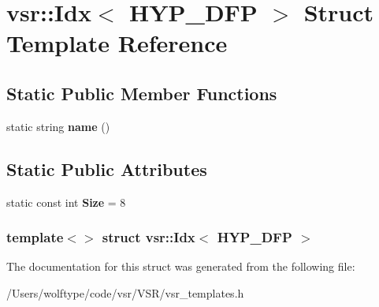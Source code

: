 \hypertarget{structvsr_1_1_idx_3_01_h_y_p___d_f_p_01_4}{\section{vsr\-:\-:Idx$<$ H\-Y\-P\-\_\-\-D\-F\-P $>$ Struct Template Reference}
\label{structvsr_1_1_idx_3_01_h_y_p___d_f_p_01_4}
}
\subsection*{Static Public Member Functions}
\begin{DoxyCompactItemize}
\item 
\hypertarget{structvsr_1_1_idx_3_01_h_y_p___d_f_p_01_4_a7cd8cab27ca61b61e62940a8c0fac247}{static string {\bfseries name} ()}\label{structvsr_1_1_idx_3_01_h_y_p___d_f_p_01_4_a7cd8cab27ca61b61e62940a8c0fac247}

\end{DoxyCompactItemize}
\subsection*{Static Public Attributes}
\begin{DoxyCompactItemize}
\item 
\hypertarget{structvsr_1_1_idx_3_01_h_y_p___d_f_p_01_4_a21b98f74ee259c7510f4990195446f4a}{static const int {\bfseries Size} = 8}\label{structvsr_1_1_idx_3_01_h_y_p___d_f_p_01_4_a21b98f74ee259c7510f4990195446f4a}

\end{DoxyCompactItemize}
\subsubsection*{template$<$$>$ struct vsr\-::\-Idx$<$ H\-Y\-P\-\_\-\-D\-F\-P $>$}



The documentation for this struct was generated from the following file\-:\begin{DoxyCompactItemize}
\item 
/\-Users/wolftype/code/vsr/\-V\-S\-R/vsr\-\_\-templates.\-h\end{DoxyCompactItemize}

